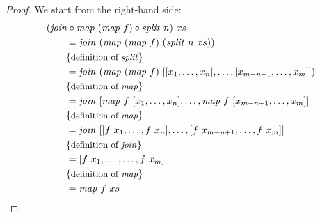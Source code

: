\begin{proof}
  We start from the right-hand side:
  \begin{align*}
    &(\join \circ \map\ (\map\ f) \circ \splitN\ n)\ xs\\
    &\qquad = \join\ (\map\ (\map\ f)\ (\splitN\ n\ xs))\\
    &\qquad \comment{definition of \splitN}\\
    &\qquad = \join\ (\map\ (\map\ f)\ [[x_1, \ldots, x_n], \ldots, [x_{m-n+1}, \ldots, x_m]])\\
    &\qquad \comment{definition of \map}\\
    &\qquad = \join\ [\map\ f\ [x_1, \ldots, x_n], \ldots, \map\ f\ [x_{m-n+1}, \ldots, x_m]]\\
    &\qquad \comment{definition of \map}\\
    &\qquad = \join\ [[f\ x_1, \ldots, f\ x_n], \ldots, [f\ x_{m-n+1}, \ldots, f\ x_m]]\\
    &\qquad \comment{definition of \join}\\
    &\qquad = [f\ x_1, \ldots, \ldots, f\ x_m]\\
    &\qquad \comment{definition of \map}\\
    &\qquad = \map\ f\ xs
  \end{align*}
\end{proof}

